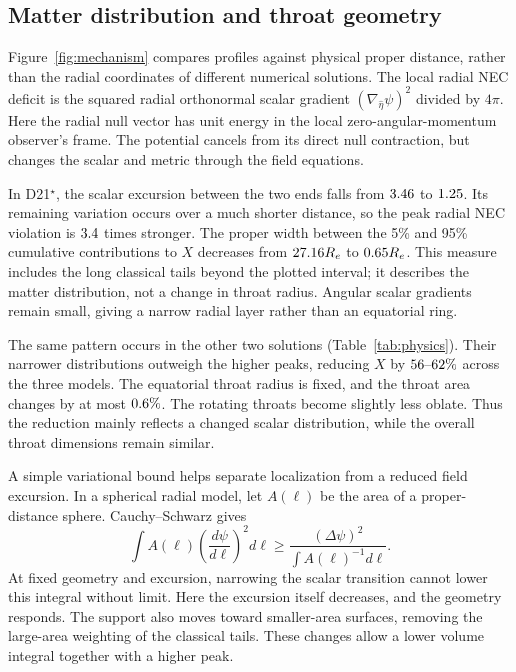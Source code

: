 \subsection{Matter distribution and throat geometry}

Figure~\ref{fig:mechanism} compares profiles against physical proper distance,
rather than the radial coordinates of different numerical solutions. The
local radial NEC deficit is the squared radial orthonormal scalar gradient $(\nabla_{\hat\eta}\psi)^2$ divided
by $4\pi$. Here the radial null vector has unit energy in the local
zero-angular-momentum observer's frame. The potential cancels from its direct
null contraction, but changes the scalar and metric through the field equations.

In D21$^\star$, the scalar excursion between the two ends falls from
$3.46$ to $1.25$. Its remaining
variation occurs over a much shorter distance, so the peak radial NEC
violation is $3.4$ times stronger. The proper width between
the 5\% and 95\% cumulative contributions to $X$ decreases from
$27.16 R_e$ to $0.65 R_e$. This measure
includes the long classical tails beyond the plotted interval; it describes
the matter distribution, not a change in throat radius. Angular scalar
gradients remain small, giving a narrow radial layer rather than an
equatorial ring.

The same pattern occurs in the other two solutions
(Table~\ref{tab:physics}). Their narrower distributions outweigh the higher
peaks, reducing $X$ by $56\text{--}62\%$ across the three models.
The equatorial throat radius is fixed, and the throat area changes by at most
$0.6\%$. The rotating throats become slightly less oblate.
Thus the reduction mainly reflects a changed scalar distribution, while the
overall throat dimensions remain similar.

A simple variational bound helps separate localization from a reduced
field excursion. In a spherical radial model, let $A(\ell)$ be the area
of a proper-distance sphere. Cauchy--Schwarz gives
\begin{equation}
\int A(\ell)\left(\frac{d\psi}{d\ell}\right)^2d\ell
\ge \frac{(\Delta\psi)^2}{\displaystyle\int A(\ell)^{-1}d\ell}.
\label{eq:cs}
\end{equation}
At fixed geometry and excursion, narrowing the scalar transition cannot
lower this integral without limit. Here the excursion itself decreases,
and the geometry responds. The support also moves toward smaller-area
surfaces, removing the large-area weighting of the classical tails.
These changes allow a lower volume integral together with a higher peak.

